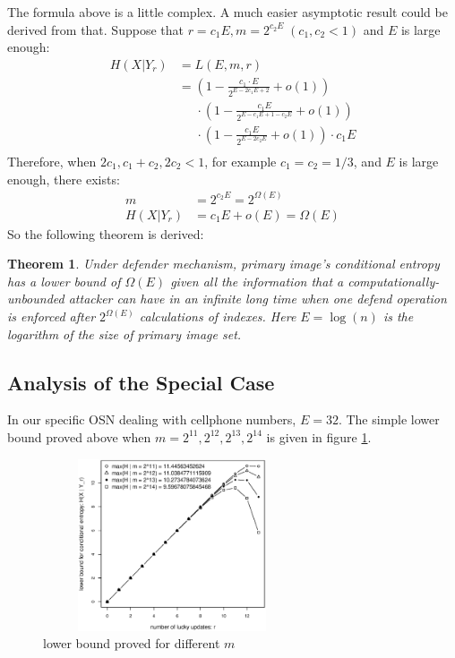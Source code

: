 \documentclass[10pt, conference, compsocconf]{IEEEtran}
\newtheorem{mytheorem}{Theorem}
\begin{document}
        The formula above is a little complex. A much easier asymptotic result
        could be derived from that. Suppose that
        $r = c_1 E, m = 2^{c_2 E} \; (c_1, c_2 < 1)$ and $E$ is large enough:
        \begin{align*}
            H(X | Y_r) &= L(E, m, r)\\
                        &= \left(1-\frac{c_1 \cdot E}{ 2^{E-2 c_1 E+2} } + o(1) \right)\\
                            &\;\;\;\;\; \cdot \left(1-\frac{c_1 E}{2^{E-c_1 E+1 - c_2 E}} + o(1) \right)\\
                            &\;\;\;\;\; \cdot \left(1-\frac{c_1 E}{2^{E-2 c_2 E}} + o(1) \right) \cdot c_1 E\\
        \end{align*}
        Therefore, when $2c_1, c_1+c_2, 2c_2 < 1$, for example $c_1 = c_2 = 1/3$,
        and $E$ is large enough, there exists:
        \begin{align*}
            m &= 2^{c_2 E} = 2^{\Omega(E)}\\
            H(X | Y_r) &= c_1E+o(E) = \Omega(E)
        \end{align*}
        So the following theorem is derived:
        \begin{mytheorem}
            Under defender mechanism,
            primary image's conditional entropy has a lower bound of $\Omega(E)$
            given all the information
            that a computationally-unbounded attacker can
            have in an infinite long time when one defend operation
            is enforced after $2^{\Omega(E)}$ calculations of indexes.
            Here $E = \log(n)$ is the
            logarithm of the size of primary image set.
        \end{mytheorem}

    \subsection{Analysis of the Special Case}
        In our specific OSN dealing with cellphone numbers,
        $E = 32$.
        The simple lower
        bound proved above when $m = 2^{11}, 2^{12}, 2^{13}, 2^{14}$ is given
        in figure \ref{lb_m}.

        \begin{figure}[!t]
        \centering
        \includegraphics[width=3in, height=2in, trim=0mm 0mm 0mm 20mm]{lb_m.eps}
        \caption{lower bound proved for different $m$}\label{lb_m}
        \end{figure}
\end{document}
